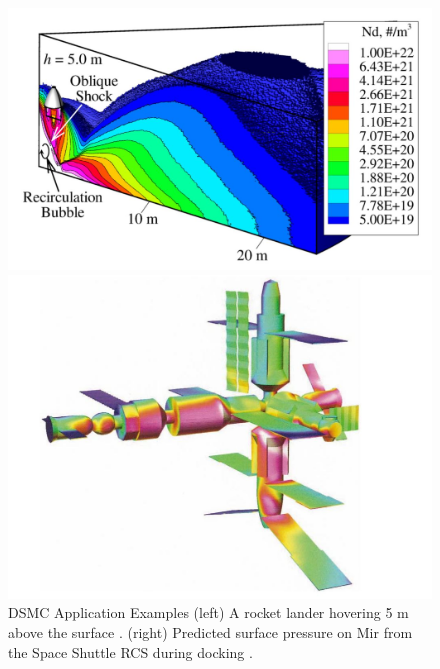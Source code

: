 \begin{figure}
    \centering
  \begin{minipage}[b]{0.49\textwidth}
    \includegraphics[width=\textwidth]{figures/hover_rocket.JPG}
  \end{minipage} %
  \begin{minipage}[b]{0.49\textwidth}
    \includegraphics[width=\textwidth]{figures/mir_shuttle.JPG}

  \end{minipage}
  \caption[DSMC Application Examples]{DSMC Application Examples (left) A rocket lander hovering 5 m above the surface \cite{hover_rocket}. (right) Predicted surface pressure on Mir from the Space Shuttle RCS during docking \cite{mir_shuttle}.}
  \label{fig:dsmc_application}
\end{figure}

